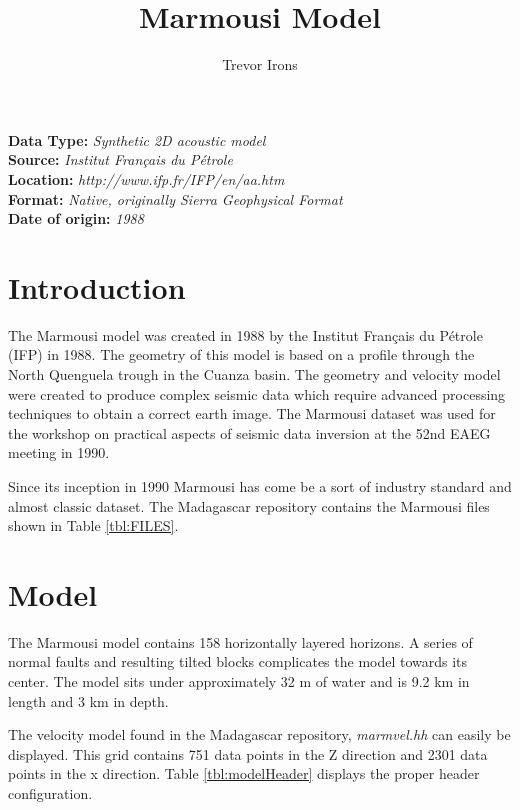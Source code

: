 \title{Marmousi Model}
\author{Trevor Irons}
\lstset{language=python,numbers=left,numberstyle=\tiny,showstringspaces=false}

\maketitle
\noindent
\textbf {Data Type:} \emph{Synthetic 2D acoustic model}\\
\textbf {Source:} \emph{Institut Fran\c{c}ais du P\'{e}trole}\\
\textbf {Location:} \emph{http://www.ifp.fr/IFP/en/aa.htm}\\
\textbf {Format:} \emph{Native, originally Sierra Geophysical Format} \\
\textbf{Date of origin:} \emph{1988}\\

\section{Introduction}
The Marmousi model was created in 1988 by the Institut Fran\c{c}ais du P\'{e}trole (IFP) in 1988.  The geometry of this model is based on a 
profile through the North Quenguela trough in the Cuanza basin. The geometry and velocity model were created to produce complex seismic data 
which require advanced processing techniques to obtain a correct earth image. The Marmousi dataset was used for the workshop on practical 
aspects of seismic data inversion at the 52nd EAEG meeting in 1990.

Since its inception in 1990 Marmousi has come be a sort of industry standard and almost classic dataset. The Madagascar repository contains 
the Marmousi files shown in Table \ref{tbl:FILES}.

{
\tiny

\normalsize
}

\section{Model}
The Marmousi model contains 158 horizontally layered horizons.  A series of normal faults and resulting tilted blocks complicates the model towards its center.  The model sits under approximately 32 m of water and is 9.2 km in length and 3 km in depth.  

The velocity model found in the Madagascar repository, \emph{marmvel.hh} can easily be displayed.  This grid contains 751 data points in the Z direction and 2301 data points in the x direction.  Table \ref{tbl:modelHeader} displays the proper header configuration.  


